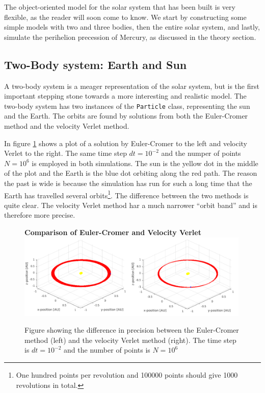 \documentclass[10pt,a4paper]{amsart}
\begin{document}
The object-oriented model for the solar system that has been built is very flexible, as the reader will soon come to know. We start by constructing some simple models with two and three bodies, then the entire solar system, and lastly, simulate the perihelion precession of Mercury, as discussed in the theory section.

\subsection{Two-Body system: Earth and Sun}

A two-body system is a meager representation of the solar system, but is the first important stepping stone towards a more interesting and realistic model. The two-body system has two instances of the \lstinline|Particle| class, representing the sun and the Earth. The orbits are found by solutions from both the Euler-Cromer method and the velocity Verlet method. 

In figure \ref{fig:earthcompare} shows a plot of a solution by Euler-Cromer to the left and velocity Verlet to the right. The same time step $dt=10^{-2}$ and the numper of points $N=10^6$ is employed in both simulations. The sun is the yellow dot in the middle of the plot and the Earth is the blue dot orbiting along the red path. The reason the past is wide is because the simulation has run for such a long time that the Earth has travelled several orbits\footnote{One hundred points per revolution and 100000 points should give 1000 revolutions in total.}. The difference between the two methods is quite clear. The velocity Verlet method har a much narrower ``orbit band'' and is therefore more precise.

\begin{figure}
	\centering
	\textbf{Comparison of Euler-Cromer and Velocity Verlet}
	\includegraphics[width=0.99\textwidth]{../figures/earthcompare.png}
	\caption{Figure showing the difference in precision between the Euler-Cromer method (left) and the velocity Verlet method (right). The time step is $dt=10^{-2}$ and the number of points is $N=10^6$\label{fig:earthcompare}}
\end{figure}
\end{document}
